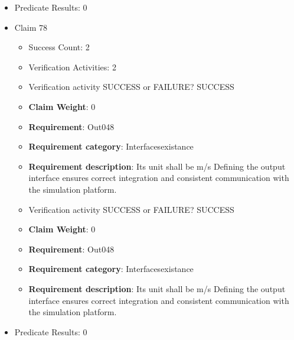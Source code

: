 \documentclass{article}
\begin{document}
\begin{itemize}
\begin{itemize}
					\item Verification activity SUCCESS or FAILURE? SUCCESS
					\item \textbf{Claim Weight}: 0
						\item \textbf{Requirement}: Out047 
						\item \textbf{Requirement category}: Interfacesexistance 
						\item \textbf{Requirement description}: Its unit shall be Rad Defining the output interface ensures correct integration and consistent communication with the simulation platform.
					
				\end{itemize}
				
									    
				\item Predicate Results: 0

  				  \item Claim 78
				\begin{itemize}
			    	\item Success Count: 2 
			    	\item Verification Activities: 2
					\item Verification activity SUCCESS or FAILURE? SUCCESS
					\item \textbf{Claim Weight}: 0
						\item \textbf{Requirement}: Out048 
						\item \textbf{Requirement category}: Interfacesexistance 
						\item \textbf{Requirement description}: Its unit shall be m/s Defining the output interface ensures correct integration and consistent communication with the simulation platform.
					
					\item Verification activity SUCCESS or FAILURE? SUCCESS
					\item \textbf{Claim Weight}: 0
						\item \textbf{Requirement}: Out048 
						\item \textbf{Requirement category}: Interfacesexistance 
						\item \textbf{Requirement description}: Its unit shall be m/s Defining the output interface ensures correct integration and consistent communication with the simulation platform.
					
				\end{itemize}
				
									    
				\item Predicate Results: 0


\end{itemize}
\end{document}
